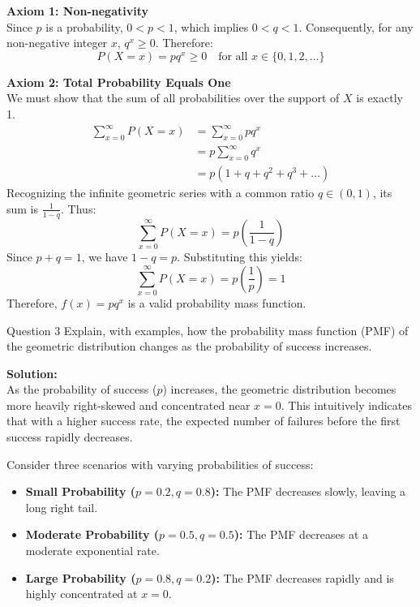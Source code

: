 \documentclass[11pt, a4paper]{article}
\begin{document}
\textbf{Axiom 1: Non-negativity} \\
Since $p$ is a probability, $0 < p < 1$, which implies $0 < q < 1$. Consequently, for any non-negative integer $x$, $q^x \ge 0$. Therefore:
\[ P(X = x) = p q^x \ge 0 \quad \text{for all } x \in \{0, 1, 2, \dots\} \]

\textbf{Axiom 2: Total Probability Equals One} \\
We must show that the sum of all probabilities over the support of $X$ is exactly 1.
\begin{align*}
    \sum_{x=0}^{\infty} P(X = x) &= \sum_{x=0}^{\infty} p q^x \\
    &= p \sum_{x=0}^{\infty} q^x \\
    &= p \left( 1 + q + q^2 + q^3 + \dots \right)
\end{align*}
Recognizing the infinite geometric series with a common ratio $q \in (0, 1)$, its sum is $\frac{1}{1 - q}$. Thus:
\[ \sum_{x=0}^{\infty} P(X = x) = p \left( \frac{1}{1 - q} \right) \]
Since $p + q = 1$, we have $1 - q = p$. Substituting this yields:
\[ \sum_{x=0}^{\infty} P(X = x) = p \left( \frac{1}{p} \right) = 1 \]
Therefore, $f(x) = p q^x$ is a valid probability mass function.

\vspace{0.5cm}
\begin{problem}{Question 3}
Explain, with examples, how the probability mass function (PMF) of the geometric distribution changes as the probability of success increases.
\end{problem}

\noindent\textbf{Solution:} \\
As the probability of success ($p$) increases, the geometric distribution becomes more heavily right-skewed and concentrated near $x = 0$. This intuitively indicates that with a higher success rate, the expected number of failures before the first success rapidly decreases.

Consider three scenarios with varying probabilities of success:
\begin{itemize}
    \item \textbf{Small Probability ($p = 0.2, q = 0.8$):} The PMF decreases slowly, leaving a long right tail.
    \item \textbf{Moderate Probability ($p = 0.5, q = 0.5$):} The PMF decreases at a moderate exponential rate.
    \item \textbf{Large Probability ($p = 0.8, q = 0.2$):} The PMF decreases rapidly and is highly concentrated at $x = 0$.
\end{itemize}
\end{document}
